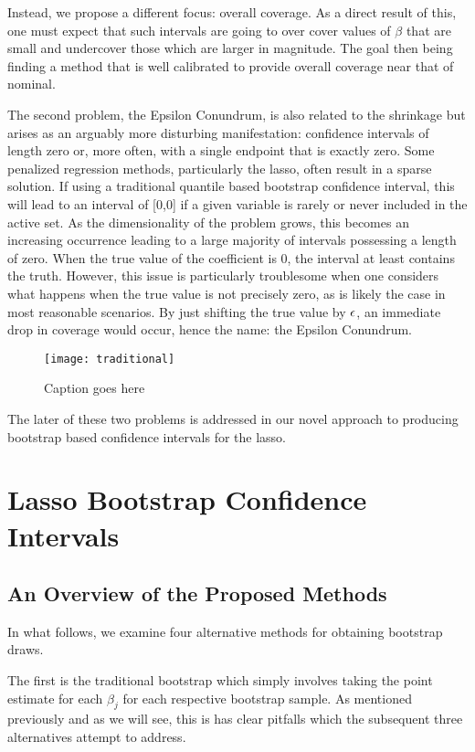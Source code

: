 Instead, we propose a different focus: overall coverage. As a direct result of this, one must expect that such intervals are going to over cover values of $\beta$ that are small and undercover those which are larger in magnitude. The goal then being finding a method that is well calibrated to provide overall coverage near that of nominal.

The second problem, the Epsilon Conundrum, is also related to the shrinkage but arises as an arguably more disturbing manifestation: confidence intervals of length zero or, more often, with a single endpoint that is exactly zero. Some penalized regression methods, particularly the lasso, often result in a sparse solution. If using a traditional quantile based bootstrap confidence interval, this will lead to an interval of [0,0] if a given variable is rarely or never included in the active set. As the dimensionality of the problem grows, this becomes an increasing occurrence leading to a large majority of intervals possessing a length of zero. When the true value of the coefficient is 0, the interval at least contains the truth. However, this issue is particularly troublesome when one considers what happens when the true value is not precisely zero, as is likely the case in most reasonable scenarios. By just shifting the true value by $\epsilon$, an immediate drop in coverage would occur, hence the name: the Epsilon Conundrum.

\begin{figure}
  \texttt{[image: traditional]}
  \caption{\label{Fig:traditional} Caption goes here}
\end{figure}



The later of these two problems is addressed in our novel approach to producing bootstrap based confidence intervals for the lasso.

\section{Lasso Bootstrap Confidence Intervals}

\subsection{An Overview of the Proposed Methods}

In what follows, we examine four alternative methods for obtaining bootstrap draws.

The first is the traditional bootstrap which simply involves taking the point estimate for each $\beta_j$ for each respective bootstrap sample. As mentioned previously and as we will see, this is has clear pitfalls which the subsequent three alternatives attempt to address.

